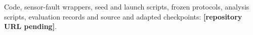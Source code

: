 Code, sensor-fault wrappers, seed and launch scripts, frozen protocols, analysis scripts, evaluation records and source and adapted checkpoints: \textbf{[repository URL pending]}.
